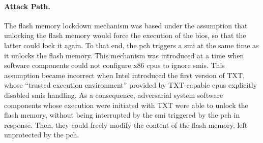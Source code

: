 \paragraph{Attack Path.}
%
The flash memory lockdown mechanism was based under the assumption that
unlocking the flash memory would force the execution of the \ac{bios}, so that
the latter could lock it again.
%
To that end, the \ac{pch} triggers a \ac{smi} at the same time as it unlocks the
flash memory.
%
This mechanism was introduced at a time when software components could not
configure x86 \acp{cpu} to ignore \acp{smi}.
%
This assumption became incorrect when Intel introduced the first version of TXT,
whose ``trusted execution environment'' provided by TXT-capable \acp{cpu}
explicitly disabled \acp{smi} handling.
%
As a consequence, adversarial system software components whose execution were
initiated with TXT were able to unlock the flash memory, without being
interrupted by the \ac{smi} triggered by the \ac{pch} in response.
%
Then, they could freely modify the content of the flash memory, left unprotected
by the \ac{pch}.


